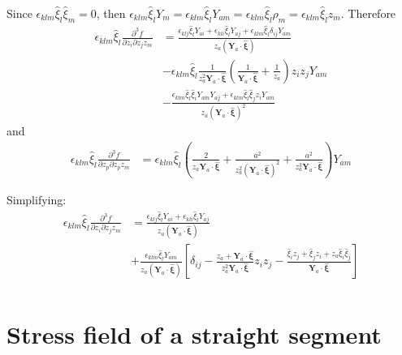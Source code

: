 Since   $\epsilon_{klm}\hat{\xi}_l\hat{\xi}_m=0$, then $\epsilon_{klm}\hat{\xi}_lY_m=\epsilon_{klm}\hat{\xi}_lY_{am}=\epsilon_{klm}\hat{\xi}_l\rho_m=\epsilon_{klm}\hat{\xi}_lz_m$. Therefore 
\begin{align}
\epsilon_{klm}\hat{\xi}_l\frac{\partial^3 f}{\partial  z_i\partial  z_j z_m}
&=\frac{\epsilon_{klj}\hat{\xi}_lY_{ai}+\epsilon_{kli}\hat{\xi}_lY_{aj}+\epsilon_{klm}\hat{\xi}_l\delta_{ij}Y_{am}}{z_a(\bm Y_a\cdot \hat{\bm \xi})}\\
&-\epsilon_{klm}\hat{\xi}_l\frac{1}{z_a^2\bm Y_a\cdot \hat{\bm \xi}}\left(\frac{1}{\bm Y_a\cdot \hat{\bm \xi}}+\frac{1}{z_a}\right)z_iz_jY_{am}\\
&-\frac{\epsilon_{klm}\hat{\xi}_l\hat{\xi}_iY_{am}Y_{aj}+\epsilon_{klm}\hat{\xi}_l\hat{\xi}_jz_iY_{am}}{z_a(\bm Y_a\cdot \hat{\bm \xi})^2}
\end{align}
and
\begin{align}
\epsilon_{klm}\hat{\xi}_l\frac{\partial^3 f}{\partial  z_p\partial  z_p z_m}&=\epsilon_{klm}\hat{\xi}_l\left(\frac{2}{z_a\bm Y_a\cdot \hat{\bm \xi}}+\frac{a^2}{z_a^2(\bm Y_a\cdot \hat{\bm \xi})^2}+\frac{a^2}{z_a^3 \bm Y_a\cdot \hat{\bm \xi}}\right)Y_{am}
\end{align}

Simplifying:
\begin{align}
\epsilon_{klm}\hat{\xi}_l\frac{\partial^3 f}{\partial  z_i\partial  z_j z_m}&=
\frac{\epsilon_{klj}\hat{\xi}_lY_{ai}+\epsilon_{kli}\hat{\xi}_lY_{aj}}{z_a(\bm Y_a\cdot \hat{\bm \xi})}\nonumber\\
&+\frac{\epsilon_{klm}\hat{\xi}_lY_{am}}{z_a(\bm Y_a\cdot \hat{\bm \xi})}\left[\delta_{ij}-\frac{z_a+\bm Y_a\cdot \hat{\bm \xi}}{z_a^2\bm Y_a\cdot \hat{\bm \xi}}z_iz_j-\frac{\hat{\xi}_iz_j+\hat{\xi}_jz_i+z_a\hat{\xi}_i\hat{\xi}_j}{\bm Y_a\cdot \hat{\bm \xi}}\right]\\
\end{align}


 
\section{Stress field of a straight segment}


